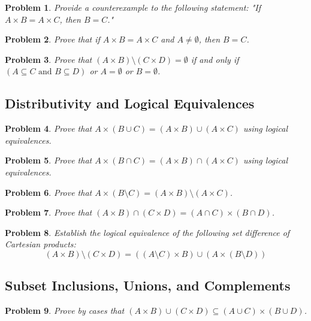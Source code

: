 \documentclass[11pt]{article}
\newtheorem{problem}{Problem}
\begin{document}
\begin{problem}
Provide a counterexample to the following statement: "If $A \times B = A \times C$, then $B = C$."
\end{problem}

\begin{problem}
Prove that if $A \times B = A \times C$ and $A \neq \emptyset$, then $B = C$.
\end{problem}

\begin{problem}
Prove that $(A \times B) \setminus (C \times D) = \emptyset$ if and only if $(A \subseteq C \text{ and } B \subseteq D)$ or $A = \emptyset$ or $B = \emptyset$.
\end{problem}

\subsection{Distributivity and Logical Equivalences}
\begin{problem}
Prove that $A \times (B \cup C) = (A \times B) \cup (A \times C)$ using logical equivalences.
\end{problem}

\begin{problem}
Prove that $A \times (B \cap C) = (A \times B) \cap (A \times C)$ using logical equivalences.
\end{problem}

\begin{problem}
Prove that $A \times (B \setminus C) = (A \times B) \setminus (A \times C)$.
\end{problem}

\begin{problem}
Prove that $(A \times B) \cap (C \times D) = (A \cap C) \times (B \cap D)$.
\end{problem}

\begin{problem}
Establish the logical equivalence of the following set difference of Cartesian products: 
\[ (A \times B) \setminus (C \times D) = ((A \setminus C) \times B) \cup (A \times (B \setminus D)) \]
\end{problem}

\subsection{Subset Inclusions, Unions, and Complements}
\begin{problem}
Prove by cases that $(A \times B) \cup (C \times D) \subseteq (A \cup C) \times (B \cup D)$.
\end{problem}
\end{document}

